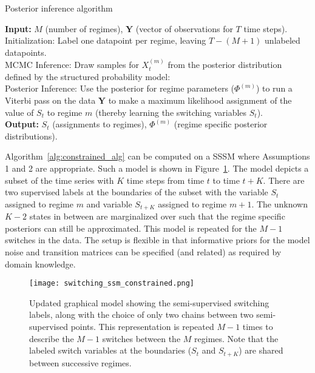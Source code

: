 \LinesNotNumbered
\begin{algorithm}
\caption{Posterior inference algorithm}\label{alg:constrained_alg}
\textbf{Input: } $M$ (number of regimes), $\mathbf{Y}$ (vector of observations for $T$ time steps).\\
\nextnr
Initialization: Label one datapoint per regime, leaving $T - (M+1)$ unlabeled datapoints.\\
\nextnr
MCMC Inference: Draw samples for $X_{t}^{(m)}$ from the posterior distribution defined by the structured probability model:\\
\nextnr
Posterior Inference: Use the posterior for regime parameters ($\Phi^{(m)}$) to run a Viterbi pass on the data $\mathbf{Y}$ to make a maximum likelihood assignment of the value of $S_t$ to regime $m$ (thereby learning the switching variables $S_t$).\\
\textbf{Output: } $S_t$ (assignments to regimes), $\Phi^{(m)}$ (regime specific posterior distributions).
\end{algorithm}

 Algorithm~\ref{alg:constrained_alg} can be computed on a SSSM where Assumptions 1 and 2 are appropriate. Such a model is shown in Figure~\ref{fig:updated_ssm_graphical_model}. The model depicts a subset of the time series with $K$ time steps from time $t$ to time $t+K$. There are two supervised labels at the boundaries of the subset with the variable $S_t$ assigned to regime $m$ and variable $S_{t+K}$ assigned to regime $m+1$. The unknown $K-2$ states in between are marginalized over such that the regime specific posteriors can still be approximated. This model is repeated for the $M-1$ switches in the data. The setup is flexible in that informative priors for the model noise and transition matrices can be specified (and related) as required by domain knowledge.

\begin{figure}
  \centering
  \texttt{[image: switching\_ssm\_constrained.png]}
  \caption{Updated graphical model showing the semi-supervised switching labels, along with the choice of only two chains between two semi-supervised points. This representation is repeated $M-1$ times to describe the $M-1$ switches between the $M$ regimes. Note that the labeled switch variables at the boundaries ($S_t$ and $S_{t+K}$) are shared between successive regimes.}
  \label{fig:updated_ssm_graphical_model}
\end{figure}
